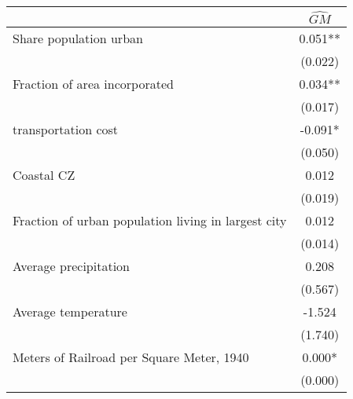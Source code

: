  \begin{tabular}{l*{1}{c}} \toprule
                &\multicolumn{1}{c}{$\widehat{GM}$}\\
\midrule
Share population urban&    0.051** \\
                &  (0.022)   \\
\addlinespace
Fraction of area incorporated&    0.034** \\
                &  (0.017)   \\
\addlinespace
1920 transportation cost&   -0.091*  \\
                &  (0.050)   \\
\addlinespace
Coastal CZ      &    0.012   \\
                &  (0.019)   \\
\addlinespace
Fraction of urban population living in largest city&    0.012   \\
                &  (0.014)   \\
\addlinespace
Average precipitation&    0.208   \\
                &  (0.567)   \\
\addlinespace
Average temperature&   -1.524   \\
                &  (1.740)   \\
\addlinespace
Meters of Railroad per Square Meter, 1940&    0.000*  \\
                &  (0.000)   \\
       \bottomrule \end{tabular}
